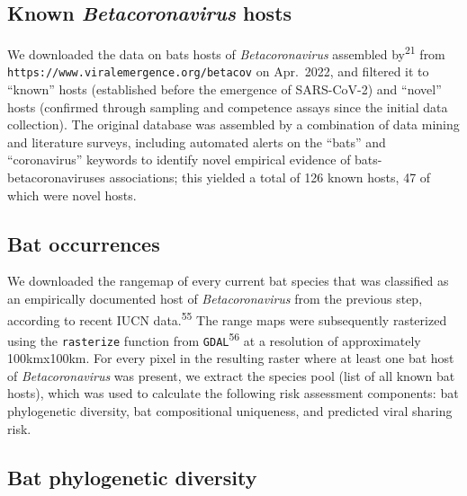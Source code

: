\documentclass[10pt,oneside]{article}
\begin{document}
\hypertarget{known-betacoronavirus-hosts}{%
\subsection{\texorpdfstring{Known \emph{Betacoronavirus}
hosts}{Known Betacoronavirus hosts}}\label{known-betacoronavirus-hosts}}

We downloaded the data on bats hosts of \emph{Betacoronavirus} assembled
by\textsuperscript{21} from
\texttt{https://www.viralemergence.org/betacov} on Apr.~2022, and
filtered it to ``known'' hosts (established before the emergence of
SARS-CoV-2) and ``novel'' hosts (confirmed through sampling and
competence assays since the initial data collection). The original
database was assembled by a combination of data mining and literature
surveys, including automated alerts on the ``bats'' and ``coronavirus''
keywords to identify novel empirical evidence of bats-betacoronaviruses
associations; this yielded a total of 126 known hosts, 47 of which were
novel hosts.

\hypertarget{bat-occurrences}{%
\subsection{Bat occurrences}\label{bat-occurrences}}

We downloaded the rangemap of every current bat species that was
classified as an empirically documented host of \emph{Betacoronavirus}
from the previous step, according to recent IUCN
data.\textsuperscript{55} The range maps were subsequently rasterized
using the \texttt{rasterize} function from
\texttt{GDAL}\textsuperscript{56} at a resolution of approximately
100kmx100km. For every pixel in the resulting raster where at least one
bat host of \emph{Betacoronavirus} was present, we extract the species
pool (list of all known bat hosts), which was used to calculate the
following risk assessment components: bat phylogenetic diversity, bat
compositional uniqueness, and predicted viral sharing risk.

\hypertarget{bat-phylogenetic-diversity}{%
\subsection{Bat phylogenetic
diversity}\label{bat-phylogenetic-diversity}}
\end{document}

